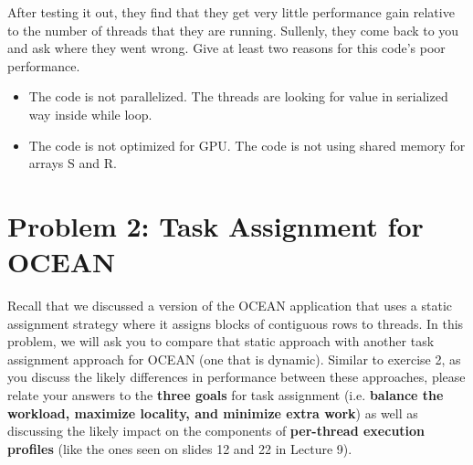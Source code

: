 \documentclass[11pt]{article}
\newenvironment{choice}{\begin{enumerate}[A.]}{\end{enumerate}}
\newenvironment{answer}{\begin{minipage}[c][1.5in]{\textwidth}}{\end{minipage}}
\begin{document}
\begin{choice}
After testing it out, they find that they get very little performance
gain relative to the number of threads that they are running. Sullenly,
they come back to you and ask where they went wrong. Give at least
two reasons for this code's poor performance.

\begin{answer}
\begin{itemize}
\item The code is not parallelized. The threads are looking for value in serialized way inside while loop.
\item The code is not optimized for GPU. The code is not using shared memory for arrays S and R. 
\end{itemize}
\end{answer}
\end{choice}

\newpage
\section*{Problem 2: Task Assignment for OCEAN}
Recall that we discussed a version of the OCEAN application that uses a static assignment strategy where it assigns blocks of contiguous rows to threads. In this problem, we will ask you to compare that static approach with another task assignment approach for OCEAN (one that is dynamic). Similar to exercise 2, as you discuss the likely differences in performance between these approaches, please relate your answers to the \textbf{three goals} for task assignment (i.e. \textbf{balance the workload, maximize locality, and minimize extra work}) as well as discussing the likely impact on the components of \textbf{per-thread execution profiles} (like the ones seen on slides 12 and 22 in Lecture 9).
\end{document}
